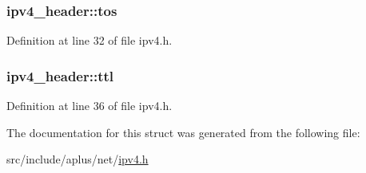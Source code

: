 \hypertarget{structipv4__header_abd794754c36bf40eec3845d1b4a30715}{
\subsubsection[{tos}]{ ipv4\+\_\+header\+::tos}}\label{structipv4__header_abd794754c36bf40eec3845d1b4a30715}


Definition at line 32 of file ipv4.\+h.

\hypertarget{structipv4__header_a847be1c747cb3282ac66c766a176ecfd}{
\subsubsection[{ttl}]{ ipv4\+\_\+header\+::ttl}}\label{structipv4__header_a847be1c747cb3282ac66c766a176ecfd}


Definition at line 36 of file ipv4.\+h.



The documentation for this struct was generated from the following file\+:\begin{DoxyCompactItemize}
\item 
src/include/aplus/net/\hyperlink{ipv4_8h}{ipv4.\+h}\end{DoxyCompactItemize}
